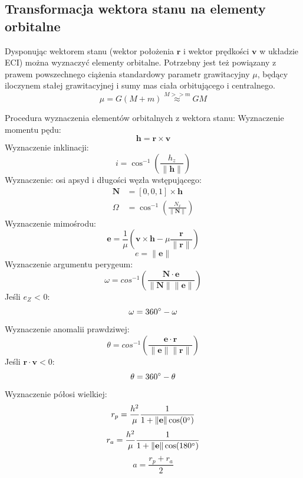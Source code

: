 \subsection{Transformacja wektora stanu na elementy orbitalne}
Dysponując wektorem stanu (wektor położenia $\mathbf{r}$ i wektor prędkości $\mathbf{v}$ w układzie ECI) można wyznaczyć elementy orbitalne. Potrzebny jest też powiązany z prawem powszechnego ciążenia standardowy parametr grawitacyjny $\mu$, będący iloczynem stałej grawitacyjnej i sumy mas ciała orbitującego i centralnego.
\begin{equation}
\mu = G(M+m) \stackrel{M >> m}{\approx} GM
\end{equation}

Procedura wyznaczenia elementów orbitalnych z wektora stanu: \newline
Wyznaczenie momentu pędu:
\begin{equation}
\mathbf{h} = \mathbf{r} \times \mathbf{v}
\end{equation}
 Wyznaczenie inklinacji:
\begin{equation}
i = \cos^{-1}{\left(\frac{h_z}{\|\mathbf{h}\|}\right)}
\end{equation}
 Wyznaczenie: osi apsyd i długości węzła wstępującego:
\begin{align}
\mathbf{N} &= [0,0,1] \times \mathbf{h} \\
\Omega &= \cos^{-1}{\left(\frac{N_x}{\|\mathbf{N}\|}\right)}
\end{align}
 Wyznaczenie mimośrodu:
\begin{equation}
\mathbf{e} = \frac{1}{\mu}\left(\mathbf{v}\times\mathbf{h}-\mu\frac{\mathbf{r}}{\|\mathbf{r}\|}\right) 
\end{equation}
\begin{equation}
e = \|\mathbf{e}\|
\end{equation}
 Wyznaczenie argumentu perygeum:
\begin{equation}
\omega = cos^{-1}\left(\frac{\mathbf{N}\cdot\mathbf{e}}{\|\mathbf{N}\|\|\mathbf{e}\|}\right)
\end{equation}
Jeśli $e_Z$ < 0:
\begin{equation}
\omega = 360\degree - \omega
\end{equation}
 Wyznaczenie anomalii prawdziwej:
\begin{equation}
\theta = cos^{-1}\left(\frac{\mathbf{e}\cdot\mathbf{r}}{\|\mathbf{e}\|\|\mathbf{r}\|}\right)
\end{equation}
Jeśli $\mathbf{r} \cdot \mathbf{v}  < 0$:
\begin{equation}
\theta = 360\degree - \theta
\end{equation}
 Wyznaczenie półosi wielkiej:
\begin{equation}
r_p = \frac{h^2}{\mu}\frac{1}{1+\|\mathbf{e}\| \cos(0\degree)}
\end{equation}
\begin{equation}
r_a = \frac{h^2}{\mu}\frac{1}{1+\|\mathbf{e}\| \cos(180\degree)}
\end{equation}
\begin{equation}
a = \frac{r_p + r_a}{2}
\end{equation}

